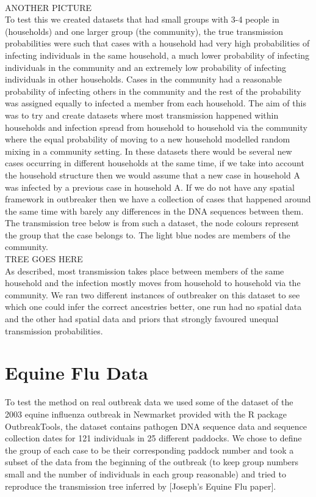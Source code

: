 \documentclass[11pt,a4paper]{report}
\begin{document}
\\
ANOTHER PICTURE
\\
To test this we created datasets that had small groups with 3-4 people in (households) and one larger group (the community), the true transmission probabilities were such that cases with a household had very high probabilities of infecting individuals in the same household, a much lower probability of infecting individuals in the community and an extremely low probability of infecting individuals in other households. Cases in the community had a reasonable probability of infecting others in the community and the rest of the probability was assigned equally to infected a member from each household. The aim of this was to try and create datasets where most transmission happened within households and infection spread from household to household via the community where the equal probability of moving to a new household modelled random mixing in a community setting. In these datasets there would be several new cases occurring in different households at the same time, if we take into account the household structure then we would assume that a new case in household A was infected by a previous case in household A. If we do not have any spatial framework in outbreaker then we have a collection of cases that happened around the same time with barely any differences in the DNA sequences between them. The transmission tree below is from such a dataset, the node colours represent the group that the case belongs to. The light blue nodes are members of the community.
\\
TREE GOES HERE
\\
As described, most transmission takes place between members of the same household and the infection mostly moves from household to household via the community. We ran two different instances of outbreaker on this dataset to see which one could infer the correct ancestries better, one run had no spatial data and the other had spatial data and priors that strongly favoured unequal transmission probabilities.







\section{Equine Flu Data}
To test the method on real outbreak data we used some of the dataset of the 2003 equine influenza outbreak in Newmarket provided with the R package OutbreakTools, the dataset contains pathogen DNA sequence data and sequence collection dates for 121 individuals in 25 different paddocks. We chose to define the group of each case to be their corresponding paddock number and took a subset of the data from the beginning of the outbreak (to keep group numbers small and the number of individuals in each group reasonable) and tried to reproduce the transmission tree inferred by [Joseph’s Equine Flu paper].
\end{document}
